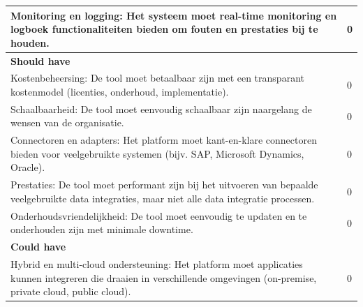 \begin{landscape}
\begin{table}[H]
{\begin{tabular}{|ll|}
\multicolumn{1}{|l|}{Monitoring en logging: Het systeem moet real-time monitoring en logboek functionaliteiten bieden om fouten en prestaties bij te houden.}                                                              & 0                            \\ \hline
\textbf{Should have}                                                                                                                                                                                                       &                              \\ \hline
\multicolumn{1}{|l|}{Kostenbeheersing: De tool moet betaalbaar zijn met een transparant kostenmodel (licenties, onderhoud, implementatie).}                                                                                & 0                            \\ \hline
\multicolumn{1}{|l|}{Schaalbaarheid: De tool moet eenvoudig schaalbaar zijn naargelang de wensen van de organisatie.}                                                                                                      & 0                            \\ \hline
\multicolumn{1}{|l|}{Connectoren en adapters: Het platform moet kant-en-klare connectoren bieden voor veelgebruikte systemen (bijv. SAP, Microsoft Dynamics, Oracle).}                                                     & 0                            \\ \hline
\multicolumn{1}{|l|}{Prestaties: De tool moet performant zijn bij het uitvoeren van bepaalde veelgebruikte data integraties, maar niet alle data integratie processen.}                                                    & 0                            \\ \hline
\multicolumn{1}{|l|}{Onderhoudsvriendelijkheid: De tool moet eenvoudig te updaten en te onderhouden zijn met minimale downtime.}                                                                                           & 0                            \\ \hline
\textbf{Could have}                                                                                                                                                                                                        &                              \\ \hline
\multicolumn{1}{|l|}{Hybrid en multi-cloud ondersteuning: Het platform moet applicaties kunnen integreren die draaien in verschillende omgevingen (on-premise, private cloud, public cloud).}                              & 0                            \\ \hline

\end{tabular}}
\end{table}
\end{landscape}
